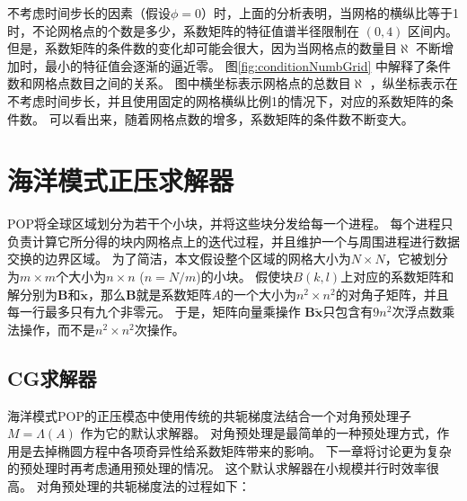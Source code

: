 不考虑时间步长的因素（假设$\phi=0$）时，上面的分析表明，当网格的横纵比等于1时，不论网格点的个数是多少，系数矩阵的特征值谱半径限制在 $(0,4)$ 区间内。
但是，系数矩阵的条件数的变化却可能会很大，因为当网格点的数量目$\aleph$ 不断增加时，最小的特征值会逐渐的逼近零。 
图\ref{fig:conditionNumbGrid} 中解释了条件数和网格点数目之间的关系。 
图中横坐标表示网格点的总数目$\aleph$ ，纵坐标表示在不考虑时间步长，并且使用固定的网格横纵比例1的情况下，对应的系数矩阵的条件数。
可以看出来，随着网格点数的增多，系数矩阵的条件数不断变大。



\section{海洋模式正压求解器}
\label{solver:bottleneck}

POP将全球区域划分为若干个小块，并将这些块分发给每一个进程。
每个进程只负责计算它所分得的块内网格点上的迭代过程，并且维护一个与周围进程进行数据交换的边界区域。 
为了简洁，本文假设整个区域的网格大小为$N\times N$，它被划分为$m\times m$个大小为$n\times n$ ($n=N/m$)的小块。 
假使块$B(k,l)$上对应的系数矩阵和解分别为$\textbf{B}$和$\tilde{\textbf{x}}$，那么$\textbf{B}$就是系数矩阵$A$的一个大小为$n^2\times n^2$的对角子矩阵，并且每一行最多只有九个非零元\cite{hu2013scalable}。 
于是，矩阵向量乘操作 $\textbf{B}\tilde{\textbf{x}}$只包含有$9n^2$次浮点数乘法操作，而不是$n^2\times n^2$次操作。 
 
\subsection{CG求解器} 
\label{solver:pcg}
 
海洋模式POP的正压模态中使用传统的共轭梯度法结合一个对角预处理子$M = \Lambda(A)$ 作为它的默认求解器。 
对角预处理是最简单的一种预处理方式，作用是去掉椭圆方程中各项奇异性给系数矩阵带来的影响。
下一章将讨论更为复杂的预处理时再考虑通用预处理的情况。
这个默认求解器在小规模并行时效率很高。 
对角预处理的共轭梯度法的过程如下： 

